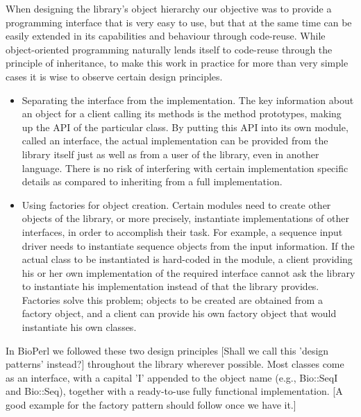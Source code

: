 \documentclass{article}
\begin{document}
\begin{twocolumn}
When designing the library's object hierarchy our objective was to
provide a programming interface that is very easy to use, but that at
the same time can be easily extended in its capabilities and behaviour
through code-reuse.  While object-oriented programming naturally lends
itself to code-reuse through the principle of inheritance, to make
this work in practice for more than very simple cases it is wise to
observe certain design principles. 

\begin{itemize}

\item Separating the interface from the implementation.  The key
information about an object for a client calling its methods is the
method prototypes, making up the API of the particular class.  By
putting this API into its own module, called an interface, the actual
implementation can be provided from the library itself just as well as
from a user of the library, even in another language.  There is no risk
of interfering with certain implementation specific details as
compared to inheriting from a full implementation.


\item Using factories for object creation.  Certain modules need to
create other objects of the library, or more precisely, instantiate
implementations of other interfaces, in order to accomplish their
task.  For example, a sequence input driver needs to instantiate
sequence objects from the input information.  If the actual class to be
instantiated is hard-coded in the module, a client providing his or
her own implementation of the required interface cannot ask the
library to instantiate his implementation instead of that the library
provides.  Factories solve this problem; objects to be created are
obtained from a factory object, and a client can provide his own
factory object that would instantiate his own classes.

\end{itemize}

In BioPerl we followed these two design principles [Shall we call this
'design patterns' instead?] throughout the library wherever
possible.  Most classes come as an interface, with a capital 'I'
appended to the object name (e.g., Bio::SeqI and Bio::Seq), together
with a ready-to-use fully functional implementation.  [A good example
for the factory pattern should follow once we have it.]


\end{twocolumn}
\end{document}
